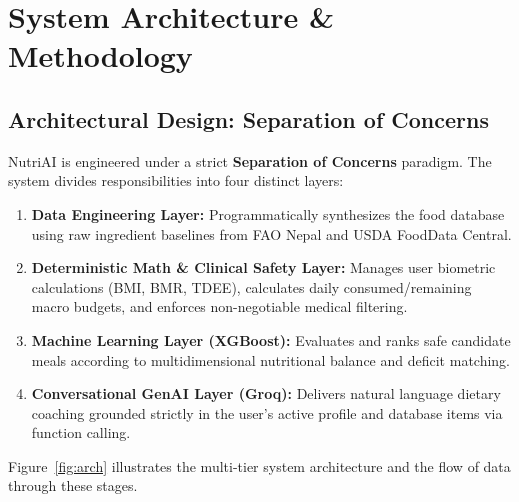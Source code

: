 \documentclass[12pt,a4paper]{report}
\begin{document}
\chapter{System Architecture \& Methodology}

\section{Architectural Design: Separation of Concerns}

NutriAI is engineered under a strict \textbf{Separation of Concerns} paradigm. The system divides responsibilities into four distinct layers:

\begin{enumerate}[leftmargin=*]
  \item \textbf{Data Engineering Layer:} Programmatically synthesizes the food database using raw ingredient baselines from FAO Nepal and USDA FoodData Central.
  \item \textbf{Deterministic Math \& Clinical Safety Layer:} Manages user biometric calculations (BMI, BMR, TDEE), calculates daily consumed/remaining macro budgets, and enforces non-negotiable medical filtering.
  \item \textbf{Machine Learning Layer (XGBoost):} Evaluates and ranks safe candidate meals according to multidimensional nutritional balance and deficit matching.
  \item \textbf{Conversational GenAI Layer (Groq):} Delivers natural language dietary coaching grounded strictly in the user's active profile and database items via function calling.
\end{enumerate}

Figure~\ref{fig:arch} illustrates the multi-tier system architecture and the flow of data through these stages.
\end{document}
